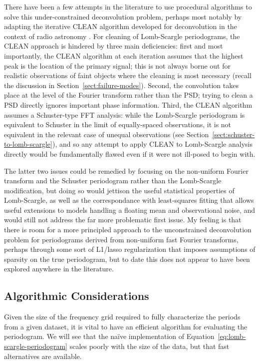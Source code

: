 \documentclass[preprint]{aastex}
\newcommand{\Eq}[1]{Equation~\ref{eq:#1}}
\newcommand{\eq}[1]{\Eq{#1}}
\newcommand{\Sect}[1]{Section~\ref{sect:#1}}
\newcommand{\sect}[1]{\Sect{#1}}
\newcommand{\sectlabel}[1]{\label{sect:#1}}
\begin{document}
There have been a few attempts in the literature to use procedural algorithms
to solve this under-constrained deconvolution problem, perhaps most notably
by adapting the iterative CLEAN algorithm developed for deconvolution in the
context of radio astronomy \citep{Roberts87}.
For cleaning of Lomb-Scargle periodograms, the CLEAN approach is hindered by
three main deficiencies: first and most importantly, the CLEAN algorithm at each
iteration assumes that the highest peak is the location of the primary signal;
this is not always borne out for realistic observations of faint objects where
the cleaning is most necessary (recall the discussion in \sect{failure-modes}).
Second, the convolution takes place at the level of the Fourier transform
rather than the PSD; trying to clean a PSD directly ignores important phase
information. Third, the CLEAN algorithm assumes a Schuster-type FFT analysis:
while the Lomb-Scargle periodogram is equivalent to Schuster in the limit of
equally-spaced observations, it is not equivalent in the relevant case of
unequal observations (see \sect{schuster-to-lomb-scargle}),
and so any attempt to apply CLEAN to Lomb-Scargle analysis directly would
be fundamentally flawed even if it were not ill-posed to begin with.

The latter two issues could be remedied by focusing on the non-uniform
Fourier transform and the Schuster periodogram rather than the Lomb-Scargle
modification, but doing so would jettison the useful statistical properties
of Lomb-Scargle, as well as the correspondance with least-squares fitting
that allows useful extensions to models handling a floating mean and
observational noise, and would still not address the far more problematic
first issue.
My feeling is that there is room for a more principled approach to the
unconstrained deconvolution problem for periodograms derived from non-uniform
fast Fourier transforms, perhaps through some sort of L1/lasso regularization
that imposes assumptions of sparsity on the true periodogram, but to date this 
does not appear to have been explored anywhere in the literature.

\subsection{Algorithmic Considerations}
\sectlabel{algorithmic-considerations}
Given the size of the frequency grid required to fully characterize the periods
from a given dataset, it is vital to have an efficient algorithm for evaluating
the periodogram. We will see that the na{\"i}ve implementation of
\eq{lomb-scargle-periodogram} scales poorly with the size of the data, but that
fast alternatives are available.
\end{document}

